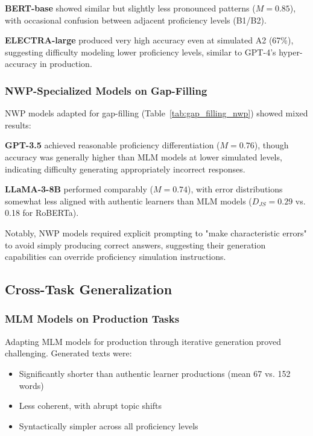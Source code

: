 \textbf{BERT-base} showed similar but slightly less pronounced patterns ($M = 0.85$), with occasional confusion between adjacent proficiency levels (B1/B2).

\textbf{ELECTRA-large} produced very high accuracy even at simulated A2 (67\%), suggesting difficulty modeling lower proficiency levels, similar to GPT-4's hyper-accuracy in production.

\subsubsection{NWP-Specialized Models on Gap-Filling}

NWP models adapted for gap-filling (Table~\ref{tab:gap_filling_nwp}) showed mixed results:

\textbf{GPT-3.5} achieved reasonable proficiency differentiation ($M = 0.76$), though accuracy was generally higher than MLM models at lower simulated levels, indicating difficulty generating appropriately incorrect responses.

\textbf{LLaMA-3-8B} performed comparably ($M = 0.74$), with error distributions somewhat less aligned with authentic learners than MLM models ($D_{JS} = 0.29$ vs. 0.18 for RoBERTa).

Notably, NWP models required explicit prompting to "make characteristic errors" to avoid simply producing correct answers, suggesting their generation capabilities can override proficiency simulation instructions.

\subsection{Cross-Task Generalization}

\subsubsection{MLM Models on Production Tasks}

Adapting MLM models for production through iterative generation proved challenging. Generated texts were:
\begin{itemize}
    \item Significantly shorter than authentic learner productions (mean 67 vs. 152 words)
    \item Less coherent, with abrupt topic shifts
    \item Syntactically simpler across all proficiency levels
\end{itemize}

